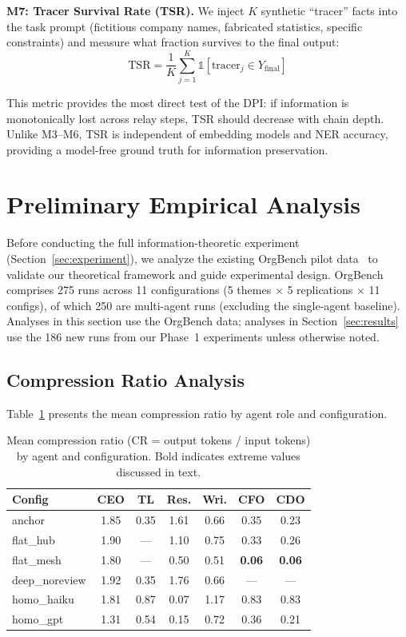 \documentclass[conference]{IEEEtran}
\begin{document}
\textbf{M7: Tracer Survival Rate (TSR).}
We inject $K$ synthetic ``tracer'' facts into the task prompt (fictitious company names, fabricated statistics, specific constraints) and measure what fraction survives to the final output:
\begin{equation}
    \text{TSR} = \frac{1}{K} \sum_{j=1}^{K} \mathbb{1}[\text{tracer}_j \in Y_{\text{final}}]
\end{equation}

This metric provides the most direct test of the DPI: if information is monotonically lost across relay steps, TSR should decrease with chain depth.
Unlike M3--M6, TSR is independent of embedding models and NER accuracy, providing a model-free ground truth for information preservation.

\section{Preliminary Empirical Analysis}
\label{sec:preliminary}

Before conducting the full information-theoretic experiment (Section~\ref{sec:experiment}), we analyze the existing OrgBench pilot data~\cite{shinoda2026orgbench} to validate our theoretical framework and guide experimental design.
OrgBench comprises 275 runs across 11 configurations (5 themes $\times$ 5 replications $\times$ 11 configs), of which 250 are multi-agent runs (excluding the single-agent baseline).
Analyses in this section use the OrgBench data; analyses in Section~\ref{sec:results} use the 186 new runs from our Phase~1 experiments unless otherwise noted.

\subsection{Compression Ratio Analysis}

Table~\ref{tab:cr} presents the mean compression ratio by agent role and configuration.

\begin{table}[t]
\centering
\caption{Mean compression ratio (CR = output tokens / input tokens) by agent and configuration. Bold indicates extreme values discussed in text.}
\label{tab:cr}
\small
\begin{tabular}{lcccccc}
\toprule
\textbf{Config} & \textbf{CEO} & \textbf{TL} & \textbf{Res.} & \textbf{Wri.} & \textbf{CFO} & \textbf{CDO} \\
\midrule
anchor       & 1.85 & 0.35 & 1.61 & 0.66 & 0.35 & 0.23 \\
flat\_hub    & 1.90 & ---  & 1.10 & 0.75 & 0.33 & 0.26 \\
flat\_mesh   & 1.80 & ---  & 0.50 & 0.51 & \textbf{0.06} & \textbf{0.06} \\
deep\_noreview & 1.92 & 0.35 & 1.76 & 0.66 & ---  & ---  \\
homo\_haiku  & 1.81 & 0.87 & 0.07 & 1.17 & 0.83 & 0.83 \\
homo\_gpt    & 1.31 & 0.54 & 0.15 & 0.72 & 0.36 & 0.21 \\
\bottomrule
\end{tabular}
\end{table}
\end{document}
